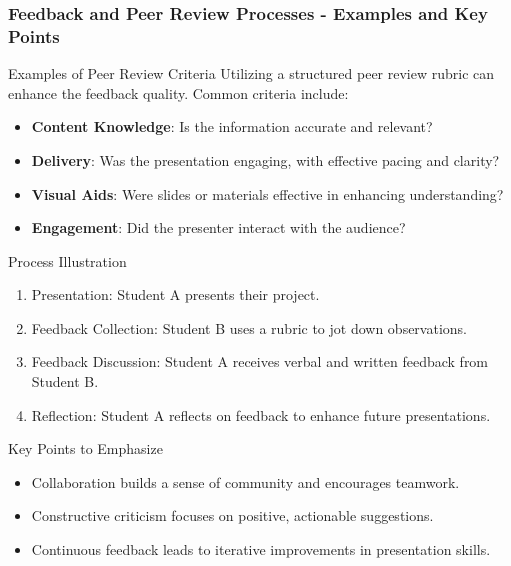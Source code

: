 \documentclass[aspectratio=169]{beamer}
\begin{document}
\begin{frame}[fragile]
    \frametitle{Feedback and Peer Review Processes - Examples and Key Points}
    \begin{block}{Examples of Peer Review Criteria}
        Utilizing a structured peer review rubric can enhance the feedback quality. Common criteria include:
        \begin{itemize}
            \item \textbf{Content Knowledge}: Is the information accurate and relevant?
            \item \textbf{Delivery}: Was the presentation engaging, with effective pacing and clarity?
            \item \textbf{Visual Aids}: Were slides or materials effective in enhancing understanding?
            \item \textbf{Engagement}: Did the presenter interact with the audience?
        \end{itemize}
    \end{block}
    
    \begin{block}{Process Illustration}
        \begin{enumerate}
            \item Presentation: Student A presents their project.
            \item Feedback Collection: Student B uses a rubric to jot down observations.
            \item Feedback Discussion: Student A receives verbal and written feedback from Student B.
            \item Reflection: Student A reflects on feedback to enhance future presentations.
        \end{enumerate}
    \end{block}
    
    \begin{block}{Key Points to Emphasize}
        \begin{itemize}
            \item Collaboration builds a sense of community and encourages teamwork.
            \item Constructive criticism focuses on positive, actionable suggestions.
            \item Continuous feedback leads to iterative improvements in presentation skills.
        \end{itemize}
    \end{block}
\end{frame}
\end{document}
